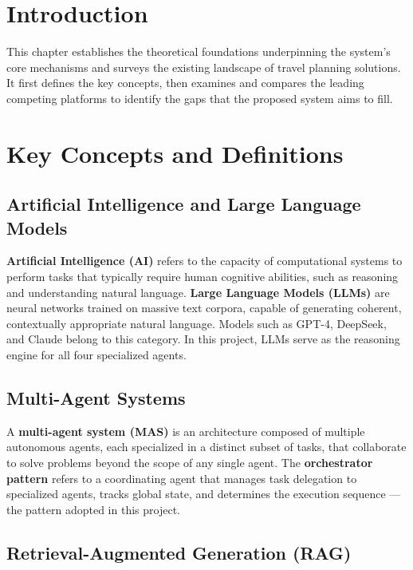 \documentclass[12pt,a4paper]{report}
\begin{document}
\section*{Introduction}

This chapter establishes the theoretical foundations underpinning the system's core mechanisms and
surveys the existing landscape of travel planning solutions. It first defines the key concepts, then
examines and compares the leading competing platforms to identify the gaps that the proposed system
aims to fill.

\section{Key Concepts and Definitions}

\subsection{Artificial Intelligence and Large Language Models}

\textbf{Artificial Intelligence (AI)} refers to the capacity of computational systems to perform
tasks that typically require human cognitive abilities, such as reasoning and understanding natural
language. \textbf{Large Language Models (LLMs)} are neural networks trained on massive text corpora,
capable of generating coherent, contextually appropriate natural language. Models such as GPT-4,
DeepSeek, and Claude belong to this category. In this project, LLMs serve as the reasoning engine
for all four specialized agents.

\subsection{Multi-Agent Systems}

A \textbf{multi-agent system (MAS)} is an architecture composed of multiple autonomous agents, each
specialized in a distinct subset of tasks, that collaborate to solve problems beyond the scope of
any single agent. The \textbf{orchestrator pattern} refers to a coordinating agent that manages task
delegation to specialized agents, tracks global state, and determines the execution sequence — the
pattern adopted in this project.

\subsection{Retrieval-Augmented Generation (RAG)}
\end{document}
